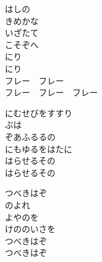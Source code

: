 \documentclass[10pt,b5j]{tarticle} %
\begin{document}
\vspace{1.5em} %
\newcommand{\linespace}{0.5em} %
\newcommand{\blocksize}{0.5\hsize} %
\begin{enumerate} %
    \begin{minipage}[c]{\blocksize}
    
        \vspace{\linespace}
        \item
        はしの\\
        きめかな\\
        いざたて\\
        こそぞへ\\
        にり\\
        にり\\
        フレー　フレー\\
        フレー　フレー　フレー
        
        \vspace{\linespace}
        \item
        にむせびをすすり\\
        ぶは\\
        ぞあふるるの\\
        にもゆるをはたに\\
        はらせるその\\
        はらせるその
        
        \vspace{\linespace}
        \item
        つべきはぞ\\
        のよれ\\
        よやのを\\
        けののいさを\\
        つべきはぞ\\
        つべきはぞ
    
    \end{minipage}
\end{enumerate} %
\end{document}
